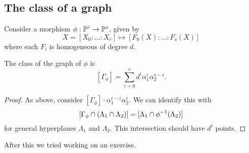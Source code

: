 \documentclass{article}
\begin{document}
\subsection{The class of a graph}

Consider a morphism $\phi: \mathbb{P}^r \to \mathbb{P}^s$, given by
\[
	X = [X_0 : \dots : X_r] \mapsto [F_0(X) : \dots : F_s(X)]
\]
where each $F_i$ is homogeneous of degree $d$.

\begin{prop}
	The class of the graph of $\phi$ is
	\[
		[\Gamma_\phi] = \sum_{i=0}^r d^i \alpha_1^i \alpha_2^{s-i}.
	\]
\end{prop}

\begin{proof}
	As above, consider $[\Gamma_\phi] \cdot \alpha_1^{r-i} \alpha_2^i$.
	We can identify this with
	\[
		[\Gamma_\phi \cap (\Lambda_1 \cap \Lambda_2)] = [\Lambda_1 \cap \phi^{-1}(\Lambda_2)]
	\]
	for general hyperplanes $\Lambda_1$ and $\Lambda_2$.
	This intersection should have $d^i$ points.
\end{proof}

After this we tried working on an exercise.
\end{document}
